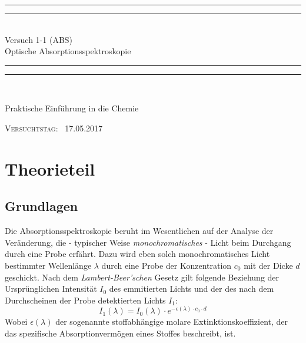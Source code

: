 \documentclass{scrartcl}
\newlength{\drop}
\begin{document}
  \begin{titlepage}
    \textheight
    \centering
    \vspace*{\baselineskip}
    \rule{\textwidth}{1.6pt}\vspace*{-\baselineskip}\vspace*{2pt}
    \rule{\textwidth}{0.4pt}\\[\baselineskip]
    {\LARGE Versuch 1-1 (ABS)\\[0.3\baselineskip] Optische Absorptionsspektroskopie}\\[0.2\baselineskip]
    \rule{\textwidth}{0.4pt}\vspace*{-\baselineskip}\vspace{3.2pt}
    \rule{\textwidth}{1.6pt}\\[\baselineskip]
    \scshape
    {Praktische Einführung in die Chemie\par}
    \vspace*{2\baselineskip}
    \vfill
    {\scshape Versuchtstag:} \        {\large 17.05.2017}\par
  \end{titlepage}
\section{Theorieteil}
\subsection{Grundlagen}
Die Absorptionsspektroskopie beruht im Wesentlichen auf der Analyse der Veränderung, die - typischer Weise \emph{monochromatisches} - Licht beim Durchgang durch eine Probe erfährt. Dazu wird eben solch monochromatisches Licht bestimmter Wellenlänge $\lambda$ durch eine Probe der Konzentration $c_0$ mit der Dicke $d$ geschickt. Nach dem \emph{Lambert-Beer’schen} Gesetz gilt folgende Beziehung der Ursprünglichen Intensität $I_0$ des emmitierten Lichts und der des nach dem Durchscheinen der Probe detektierten Lichts $I_1$:
\begin{equation}\label{eq:LamBeer}
	I_1(\lambda) = I_0(\lambda)\cdot e^{-\epsilon(\lambda)\cdot c_0\cdot d}
\end{equation}
Wobei $\epsilon(\lambda)$ der sogenannte stoffabhängige molare Extinktionskoeffizient, der das spezifische Absorptionvermögen eines Stoffes beschreibt, ist. 
\end{document}
